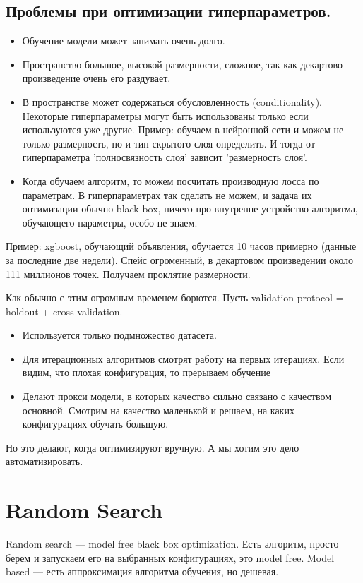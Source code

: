 \subsection{Проблемы при оптимизации гиперпараметров.}
\begin{itemize}
    \item  Обучение модели может занимать очень долго.
    \item Пространство большое, высокой размерности, сложное, так как декартово произведение очень его раздувает.
    \item В пространстве может содержаться обусловленность (conditionality). Некоторые гиперпараметры могут быть использованы только если используются уже другие. Пример: обучаем в нейронной сети и можем не только размерность, но и тип скрытого слоя определить. И тогда от гиперпараметра 'полносвязность слоя' зависит 'размерность слоя'.
    \item  Когда обучаем алгоритм, то можем посчитать производную лосса по параметрам. В гиперпараметрах так сделать не можем, и задача их оптимизации обычно black box, ничего про внутренне устройство алгоритма, обучающего параметры, особо не знаем.
\end{itemize}
Пример: xgboost, обучающий объявления, обучается 10 часов примерно (данные за последние две недели). Спейс огроменный, в декартовом произведении около 111 миллионов точек. Получаем проклятие размерности.

Как обычно с этим огромным временем борются. Пусть validation protocol = holdout + cross-validation.
\begin{itemize}
    \item Используется только подмножество датасета.
    \item Для итерационных алгоритмов смотрят работу на первых итерациях. Если видим, что плохая конфигурация, то прерываем обучение
    \item Делают прокси модели, в которых качество сильно связано с качеством основной. Смотрим на качество маленькой и решаем, на каких конфигурациях обучать большую.
\end{itemize}
Но это делают, когда оптимизируют вручную. А мы хотим это дело автоматизировать.

\section{Random Search}
Random search --- model free black box optimization. Есть алгоритм, просто берем и запускаем его на выбранных конфигурациях, это model free. Model based --- есть аппроксимация алгоритма обучения, но дешевая.
    
